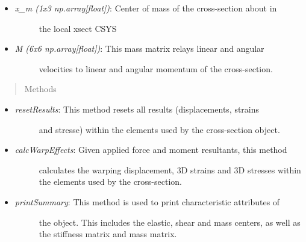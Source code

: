 \documentclass[letterpaper,10pt,english]{sphinxmanual}
\begin{document}
\begin{fulllineitems}
\begin{itemize}
\begin{description}
\end{description}

\item {} \begin{description}
\item[{\emph{x\_m (1x3 np.array{[}float{]})}: Center of mass of the cross-section about in}] \leavevmode
the local xsect CSYS

\end{description}

\item {} \begin{description}
\item[{\emph{M (6x6 np.array{[}float{]})}: This mass matrix relays linear and angular}] \leavevmode
velocities to linear and angular momentum of the cross-section.

\end{description}

\end{itemize}
\begin{quote}\begin{description}
\item[{Methods}] \leavevmode
\end{description}\end{quote}
\begin{itemize}
\item {} \begin{description}
\item[{\emph{resetResults}: This method resets all results (displacements, strains}] \leavevmode
and stresse) within the elements used by the cross-section object.

\end{description}

\item {} \begin{description}
\item[{\emph{calcWarpEffects}: Given applied force and moment resultants, this method}] \leavevmode
calculates the warping displacement, 3D strains and 3D stresses
within the elements used by the cross-section.

\end{description}

\item {} \begin{description}
\item[{\emph{printSummary}: This method is used to print characteristic attributes of}] \leavevmode
the object. This includes the elastic, shear and mass centers, as
well as the stiffness matrix and mass matrix.


\end{description}
\end{itemize}
\end{fulllineitems}
\end{document}
